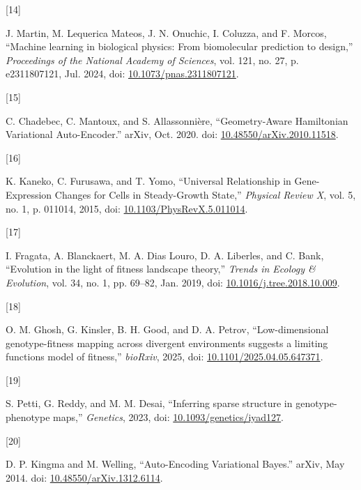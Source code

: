 \documentclass[
]{scrartcl}
\newlength{\cslhangindent}
\newlength{\csllabelwidth}
\newenvironment{CSLReferences}[2] %
 {\begin{list}{}{%
  \setlength{\itemindent}{0pt}
  \setlength{\leftmargin}{0pt}
  \setlength{\parsep}{0pt}
  \ifodd #1
   \setlength{\leftmargin}{\cslhangindent}
   \setlength{\itemindent}{-1\cslhangindent}
  \fi
  \setlength{\itemsep}{#2\baselineskip}}}
 {\end{list}}
\newcommand{\CSLLeftMargin}[1]{\parbox[t]{\csllabelwidth}{\strut#1\strut}}
\newcommand{\CSLRightInline}[1]{\parbox[t]{\linewidth - \csllabelwidth}{\strut#1\strut}}
\begin{document}
\begin{CSLReferences}{0}{0}
\CSLLeftMargin{{[}14{]} }%
\CSLRightInline{J. Martin, M. Lequerica Mateos, J. N. Onuchic, I.
Coluzza, and F. Morcos, {``Machine learning in biological physics:
{From} biomolecular prediction to design,''} \emph{Proceedings of the
National Academy of Sciences}, vol. 121, no. 27, p. e2311807121, Jul.
2024, doi:
\href{https://doi.org/10.1073/pnas.2311807121}{10.1073/pnas.2311807121}.}

\CSLLeftMargin{{[}15{]} }%
\CSLRightInline{C. Chadebec, C. Mantoux, and S. Allassonnière,
{``Geometry-{Aware Hamiltonian Variational Auto-Encoder}.''} arXiv, Oct.
2020. doi:
\href{https://doi.org/10.48550/arXiv.2010.11518}{10.48550/arXiv.2010.11518}.}

\CSLLeftMargin{{[}16{]} }%
\CSLRightInline{K. Kaneko, C. Furusawa, and T. Yomo, {``Universal
{Relationship} in {Gene-Expression Changes} for {Cells} in
{Steady-Growth State},''} \emph{Physical Review X}, vol. 5, no. 1, p.
011014, 2015, doi:
\href{https://doi.org/10.1103/PhysRevX.5.011014}{10.1103/PhysRevX.5.011014}.}

\CSLLeftMargin{{[}17{]} }%
\CSLRightInline{I. Fragata, A. Blanckaert, M. A. Dias Louro, D. A.
Liberles, and C. Bank, {``Evolution in the light of fitness landscape
theory,''} \emph{Trends in Ecology \& Evolution}, vol. 34, no. 1, pp.
69--82, Jan. 2019, doi:
\href{https://doi.org/10.1016/j.tree.2018.10.009}{10.1016/j.tree.2018.10.009}.}

\CSLLeftMargin{{[}18{]} }%
\CSLRightInline{O. M. Ghosh, G. Kinsler, B. H. Good, and D. A. Petrov,
{``Low-dimensional genotype-fitness mapping across divergent
environments suggests a limiting functions model of fitness,''}
\emph{bioRxiv}, 2025, doi:
\href{https://doi.org/10.1101/2025.04.05.647371}{10.1101/2025.04.05.647371}.}

\CSLLeftMargin{{[}19{]} }%
\CSLRightInline{S. Petti, G. Reddy, and M. M. Desai, {``Inferring sparse
structure in genotype-phenotype maps,''} \emph{Genetics}, 2023, doi:
\href{https://doi.org/10.1093/genetics/iyad127}{10.1093/genetics/iyad127}.}

\CSLLeftMargin{{[}20{]} }%
\CSLRightInline{D. P. Kingma and M. Welling, {``Auto-{Encoding
Variational Bayes}.''} arXiv, May 2014. doi:
\href{https://doi.org/10.48550/arXiv.1312.6114}{10.48550/arXiv.1312.6114}.}


\end{CSLReferences}
\end{document}
